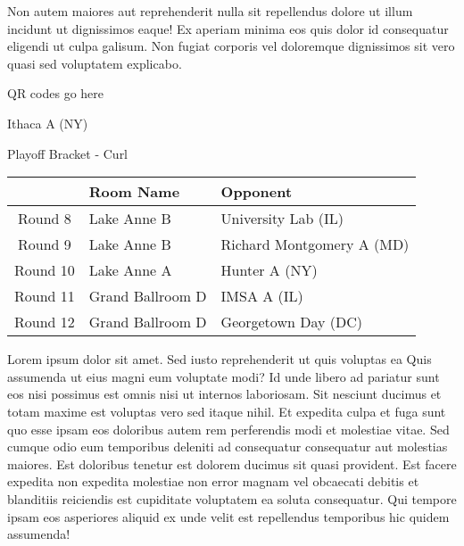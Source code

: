 \documentclass{article}%
\begin{document}
\newline%
Non autem maiores aut reprehenderit nulla sit repellendus dolore ut illum incidunt ut dignissimos eaque! Ex aperiam minima eos quis dolor id consequatur eligendi ut culpa galisum. Non fugiat corporis vel doloremque dignissimos sit vero quasi sed voluptatem explicabo.\newline%
\newline%
%
\vspace*{30pt}%
\begin{center}%
\begin{Huge}%
QR codes go here%
\end{Huge}%
\end{center}%
\newpage%
\begin{center}%
\begin{Huge}%
Ithaca A (NY)%
\end{Huge}%
\vspace*{8pt}%
\linebreak%
\begin{Large}%
Playoff Bracket {-} Curl%
\end{Large}%
\end{center}%
%
\begin{tabularx}{\textwidth}{|c|Y|Y|}%
\hline%
&Room Name&Opponent\\%
\hline%
Round 8&Lake Anne B&University Lab (IL)\\%
Round 9&Lake Anne B&Richard Montgomery A (MD)\\%
Round 10&Lake Anne A&Hunter A (NY)\\%
Round 11&Grand Ballroom D&IMSA A (IL)\\%
Round 12&Grand Ballroom D&Georgetown Day (DC)\\%
\hline%
\end{tabularx}%
\vspace*{8pt}%
\linebreak%
\newline%
\newline%
Lorem ipsum dolor sit amet. Sed iusto reprehenderit ut quis voluptas ea Quis assumenda ut eius magni eum voluptate modi? Id unde libero ad pariatur sunt eos nisi possimus est omnis nisi ut internos laboriosam. Sit nesciunt ducimus et totam maxime est voluptas vero sed itaque nihil. Et expedita culpa et fuga sunt quo esse ipsam eos doloribus autem rem perferendis modi et molestiae vitae.\newline%
\newline%
Sed cumque odio eum temporibus deleniti ad consequatur consequatur aut molestias maiores. Est doloribus tenetur est dolorem ducimus sit quasi provident. Est facere expedita non expedita molestiae non error magnam vel obcaecati debitis et blanditiis reiciendis est cupiditate voluptatem ea soluta consequatur. Qui tempore ipsam eos asperiores aliquid ex unde velit est repellendus temporibus hic quidem assumenda!\newline%
\end{document}

